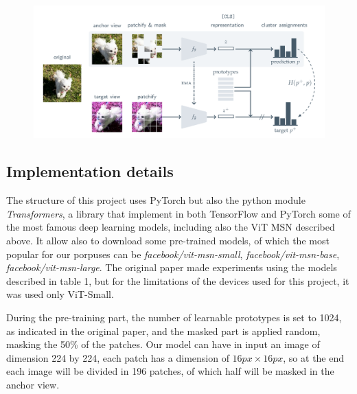 \documentclass[column]{article}
\begin{document}
	
	\begin{figure}[h]
		\centering
		\includegraphics[width=\textwidth]{Images/screenshot001}
		\caption[MSN workflow]{}
		\label{fig:screenshot001}
	\end{figure}
	
	\begin{multicols}{2}
		
		
	\section{Implementation details}
	
	The structure of this project uses PyTorch but also the python module \textit{Transformers}, a library that implement in both TensorFlow and PyTorch some of the most famous deep learning models, including also
	the ViT MSN described above. It allow also to download some pre-trained models, of which the most popular for our porpuses can be \textit{facebook/vit-msn-small}, \textit{facebook/vit-msn-base}, \textit{facebook/vit-msn-large}. The original paper made experiments using the models described in table 1, but for the limitations of the devices used for this project, it was used only ViT-Small.
	
	During the pre-training part, the number of learnable prototypes is set to 1024, as indicated in the original paper, and the masked part is applied random, masking the 50\% of the patches. Our model can have in input an image of dimension 224 by 224, each patch has a dimension of $16px \times 16px$, so at the end each image will be divided in 196 patches, of which half will be masked in the anchor view.
		
	\end{multicols}
	
	\begin{table}[ht]
			\centering
		\caption{ViT. models hyper-parameters}
		\label{tab:vit_specs}
	\end{table}
	
\end{document}
